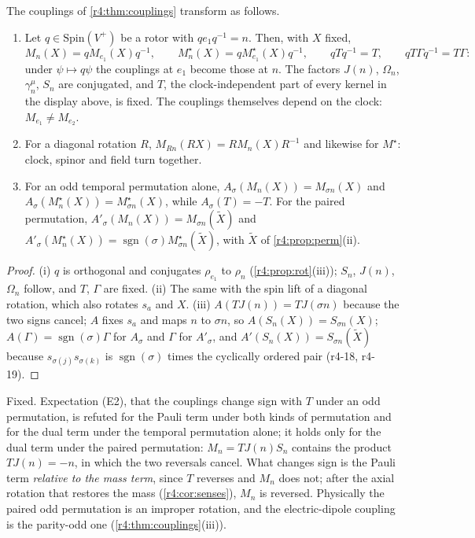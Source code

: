 \begin{proposition}
\label{r4:prop:coupclock}
The couplings of \cref{r4:thm:couplings} transform as follows.
\begin{enumerate}[label=(\roman*),leftmargin=2.2em]
\item Let $q\in\mathrm{Spin}(V^+)$ be a rotor with $qe_1q^{-1}=n$. Then, with $X$ fixed,
\[
M_n(X)=qM_{e_1}(X)q^{-1},\qquad M^\star_n(X)=qM^\star_{e_1}(X)q^{-1},\qquad qTq^{-1}=T,\qquad qT\Gamma q^{-1}=T\Gamma :
\]
under $\psi\mapsto q\psi$ the couplings at $e_1$ become those at $n$. The factors $J(n)$, $\Omega_n$, $\gamma^\mu_n$, $S_n$ are conjugated, and $T$, the
clock-independent part of every kernel in the display above, is fixed. The couplings themselves depend on the clock: $M_{e_1}\neq M_{e_2}$.
\item For a diagonal rotation $R$, $M_{Rn}(RX)=RM_n(X)R^{-1}$ and likewise for $M^\star$: clock, spinor and field turn together.
\item For an odd temporal permutation alone, $A_\sigma(M_n(X))=M_{\sigma n}(X)$ and $A_\sigma(M^\star_n(X))=M^\star_{\sigma n}(X)$, while $A_\sigma(T)=-T$. For the paired
permutation, $A'_\sigma(M_n(X))=M_{\sigma n}(\tilde X)$ and $A'_\sigma(M^\star_n(X))=\operatorname{sgn}(\sigma)M^\star_{\sigma n}(\tilde X)$, with $\tilde X$ of \cref{r4:prop:perm}(ii).
\end{enumerate}
\end{proposition}

\begin{proof}
(i) $q$ is orthogonal and conjugates $\rho_{e_1}$ to $\rho_n$ (\cref{r4:prop:rot}(iii)); $S_n$, $J(n)$, $\Omega_n$ follow, and $T$, $\Gamma$ are fixed. (ii) The same with the
spin lift of a diagonal rotation, which also rotates $s_a$ and $X$. (iii) $A(TJ(n))=TJ(\sigma n)$ because the two signs cancel; $A$ fixes $s_a$ and maps $n$ to
$\sigma n$, so $A(S_n(X))=S_{\sigma n}(X)$; $A(\Gamma)=\operatorname{sgn}(\sigma)\Gamma$ for $A_\sigma$ and $\Gamma$ for $A'_\sigma$, and $A'(S_n(X))=S_{\sigma n}(\tilde X)$ because
$s_{\sigma(j)}s_{\sigma(k)}$ is $\operatorname{sgn}(\sigma)$ times the cyclically ordered pair (r4-18, r4-19).
\end{proof}

Fixed. Expectation (E2), that the couplings change sign with $T$ under an odd permutation, is refuted for the Pauli term under both kinds of
permutation and for the dual term under the temporal permutation alone; it holds only for the dual term under the paired permutation:
$M_n=TJ(n)S_n$ contains the product $TJ(n)=-n$, in which the two reversals cancel. What changes sign is the
Pauli term \emph{relative to the mass term}, since $T$ reverses and $M_n$ does not; after the axial rotation that restores the mass
(\cref{r4:cor:senses}), $M_n$ is reversed. Physically the paired odd permutation is an improper rotation, and the electric-dipole coupling is the
parity-odd one (\cref{r4:thm:couplings}(iii)).

